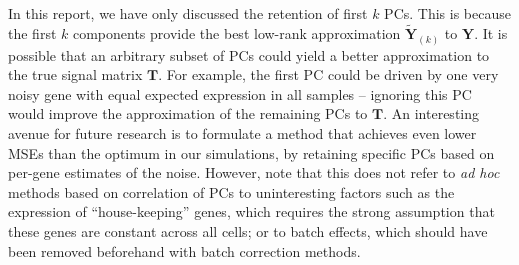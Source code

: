 \documentclass[10pt,letterpaper]{article}
\begin{document}
In this report, we have only discussed the retention of first $k$ PCs.
This is because the first $k$ components provide the best low-rank approximation $\mathbf{\tilde Y}_{(k)}$ to $\mathbf{Y}$.
It is possible that an arbitrary subset of PCs could yield a better approximation to the true signal matrix $\mathbf{T}$.
For example, the first PC could be driven by one very noisy gene with equal expected expression in all samples --
ignoring this PC would improve the approximation of the remaining PCs to $\mathbf{T}$.
An interesting avenue for future research is to formulate a method that achieves even lower MSEs than the optimum in our simulations,
by retaining specific PCs based on per-gene estimates of the noise.
However, note that this does not refer to \textit{ad hoc} methods based on correlation of PCs to uninteresting factors such as the expression of ``house-keeping'' genes,
which requires the strong assumption that these genes are constant across all cells;
or to batch effects, which should have been removed beforehand with batch correction methods.



\end{document}
